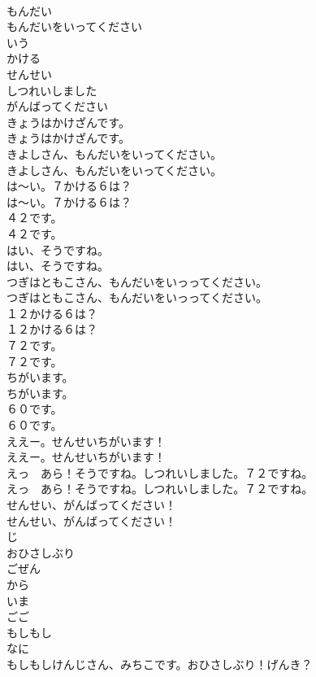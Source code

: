 \documentclass[8pt]{extreport}
\begin{document}
\begin{CJK}{UTF8}{min}
\\	もんだい
\\	もんだいをいってください
\\	いう
\\	かける
\\	せんせい
\\	しつれいしました
\\	がんばってください
\\	きょうはかけざんです。	
\\	きょうはかけざんです。 
\\	きよしさん、もんだいをいってください。	
\\	きよしさん、もんだいをいってください。 
\\	は〜い。７かける６は？	
\\	は〜い。７かける６は？ 
\\	４２です。	
\\	４２です。 
\\	はい、そうですね。	
\\	はい、そうですね。 
\\	つぎはともこさん、もんだいをいっってください。	
\\	つぎはともこさん、もんだいをいっってください。 
\\	１２かける６は？	
\\	１２かける６は？ 
\\	７２です。	
\\	７２です。 
\\	ちがいます。	
\\	ちがいます。 
\\	６０です。	
\\	６０です。 
\\	ええー。せんせいちがいます！	
\\	ええー。せんせいちがいます！ 
\\	えっ　あら！そうですね。しつれいしました。７２ですね。	
\\	えっ　あら！そうですね。しつれいしました。７２ですね。 
\\	せんせい、がんばってください！	
\\	せんせい、がんばってください！ 
\\	じ
\\	おひさしぶり
\\	ごぜん
\\	から
\\	いま
\\	ごご
\\	もしもし
\\	なに
\\	もしもしけんじさん、みちこです。おひさしぶり！げんき？	

\end{CJK}
\end{document}
